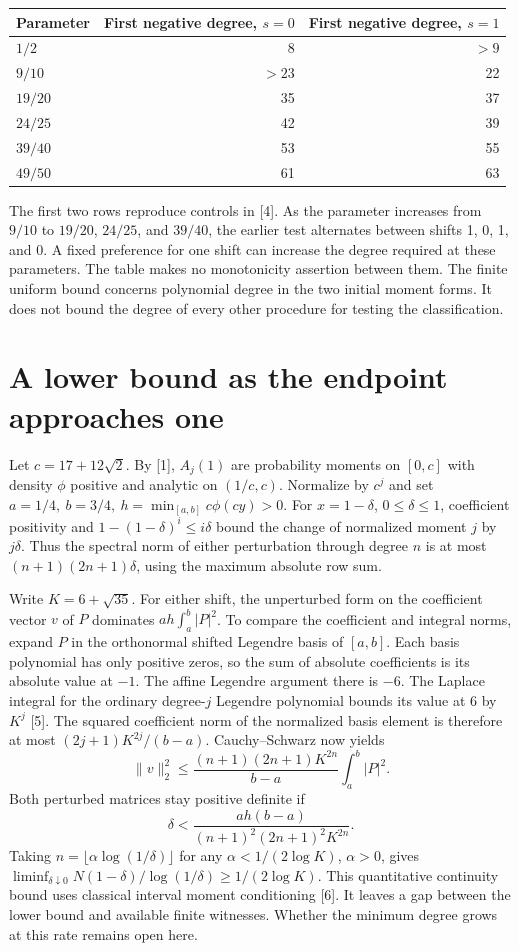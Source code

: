 \documentclass[11pt]{article}
\newcommand{\A}{A}\newcommand{\Lx}{\mathcal L_x}
\begin{document}
\begin{center}
\begin{tabular}{lrr}\toprule
Parameter & First negative degree, \(s=0\) & First negative degree, \(s=1\)\\\midrule
\(1/2\)&8&\(>9\)\\
\(9/10\)&\(>23\)&22\\
\(19/20\)&35&37\\
\(24/25\)&42&39\\
\(39/40\)&53&55\\
\(49/50\)&61&63\\\bottomrule
\end{tabular}
\end{center}
The first two rows reproduce controls in [4]. As the parameter increases from \(9/10\) to \(19/20\), \(24/25\), and \(39/40\), the earlier test alternates between shifts 1, 0, 1, and 0. A fixed preference for one shift can increase the degree required at these parameters. The table makes no monotonicity assertion between them. The finite uniform bound concerns polynomial degree in the two initial moment forms. It does not bound the degree of every other procedure for testing the classification.

\section{A lower bound as the endpoint approaches one}
Let \(c=17+12\sqrt2\). By [1], \(\A_j(1)\) are probability moments on \([0,c]\) with density \(\phi\) positive and analytic on \((1/c,c)\). Normalize by \(c^j\) and set \(a=1/4,\ b=3/4,\ h=\min_{[a,b]} c\phi(cy)>0\). For \(x=1-\delta\), \(0\le\delta\le1\), coefficient positivity and \(1-(1-\delta)^i\le i\delta\) bound the change of normalized moment \(j\) by \(j\delta\). Thus the spectral norm of either perturbation through degree \(n\) is at most \((n+1)(2n+1)\delta\), using the maximum absolute row sum.

Write \(K=6+\sqrt{35}\). For either shift, the unperturbed form on the coefficient vector \(v\) of \(P\) dominates \(ah\int_a^b|P|^2\). To compare the coefficient and integral norms, expand \(P\) in the orthonormal shifted Legendre basis of \([a,b]\). Each basis polynomial has only positive zeros, so the sum of absolute coefficients is its absolute value at \(-1\). The affine Legendre argument there is \(-6\). The Laplace integral for the ordinary degree-\(j\) Legendre polynomial bounds its value at 6 by \(K^j\) [5]. The squared coefficient norm of the normalized basis element is therefore at most \((2j+1)K^{2j}/(b-a)\).
\newpage
Cauchy--Schwarz now yields
\[
  \|v\|_2^2\le \frac{(n+1)(2n+1)K^{2n}}{b-a}\int_a^b|P|^2 .
\]
Both perturbed matrices stay positive definite if
\[
  \delta < \frac{ah(b-a)}{(n+1)^2(2n+1)^2 K^{2n}}.
\]
Taking \(n=\lfloor\alpha\log(1/\delta)\rfloor\) for any \(\alpha<1/(2\log K)\), \(\alpha>0\), gives
\(\liminf_{\delta\downarrow0}N(1-\delta)/\log(1/\delta)\ge1/(2\log K)\).
This quantitative continuity bound uses classical interval moment conditioning [6]. It leaves a gap between the lower bound and available finite witnesses. Whether the minimum degree grows at this rate remains open here.
\end{document}

